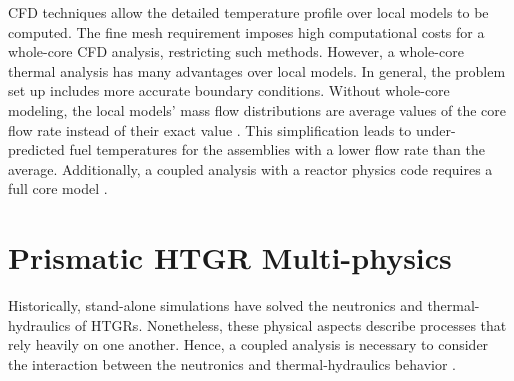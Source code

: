 CFD techniques allow the detailed temperature profile over local models to be computed.
The fine mesh requirement imposes high computational costs for a whole-core CFD analysis, restricting such methods.
However, a whole-core thermal analysis has many advantages over local models.
In general, the problem set up includes more accurate boundary conditions.
Without whole-core modeling, the local models' mass flow distributions are average values of the core flow rate instead of their exact value \cite{huning_novel_2016}.
This simplification leads to under-predicted fuel temperatures for the assemblies with a lower flow rate than the average.
Additionally, a coupled analysis with a reactor physics code requires a full core model \cite{tak_practical_2012}.


\section{Prismatic HTGR Multi-physics}

Historically, stand-alone simulations have solved the neutronics and thermal-hydraulics of \glspl{HTGR}.
Nonetheless, these physical aspects describe processes that rely heavily on one another.
Hence, a coupled analysis is necessary to consider the interaction between the neutronics and thermal-hydraulics behavior \cite{tak_cappgamma_2016}.

